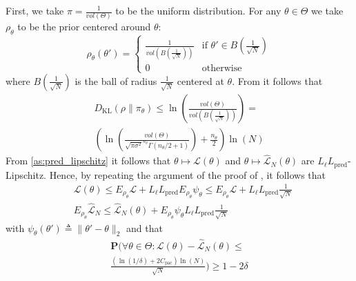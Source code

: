 \documentclass{ifacconf}
\newcommand{\KL}{D_{\mathrm{KL}}}
\newcommand{\bP}{\mathbf{P}}
\begin{document}
\begin{pf}
  First, we take $\pi=\frac{1}{vol(\Theta)}$ to be the uniform distribution.
  For any $\theta \in \Theta$ we take $\rho_\theta$ to be the prior centered around $\theta$: 
  $$\rho_{\theta}(\theta')=\left\{\begin{array}{rl}
       \frac{1}{vol(B(\frac{1}{\sqrt{N}}))} & \text{if } \theta' \in B(\frac{1}{\sqrt{N}}) \\
       0 & \text{otherwise}
     \end{array}\right.$$    
     where $B(\frac{1}{\sqrt{N}})$ is the ball of radius $\frac{1}{\sqrt{N}}$ centered at $\theta$.
From \cite[Lemma C.24]{Nips2026} it follows that 
\begin{multline}
\KL(\rho \|\pi_\theta) \le 
  \ln\left(\frac{vol(\Theta)}{vol(B(\frac{1}{\sqrt{N}}))}\right)= \\
  \left(\ln\left(\frac{vol(\Theta)}{\sqrt{\pi \sigma^2}^{n_{\theta}} \Gamma(n_{\theta}/2+1)}\right)+ \frac{n_{\theta}}{2} \right) \ln(N)
\end{multline}
From \ref{as:pred_lipschitz} it follows that
$\theta \mapsto \mathcal{L}(\theta)$ and 
$\theta \mapsto \hat{\mathcal{L}}_N(\theta)$ are $L_{\ell}L_{\text{pred}}$-Lipschitz. Hence, by repeating the argument of the proof
of \cite[Corollary  C23]{Nips2026}, it follows that
\begin{equation}
  \label{loss:lipschitz1}
\begin{split}
   & \mathcal{L}(\theta) \le E_{\rho_\theta} \mathcal{L} +
     L_{\ell}L_{\text{pred}} E_{\rho_\theta}\psi_\theta \le  
      E_{\rho_\theta} \mathcal{L} + L_{\ell}L_{\text{pred}}\frac{1}{\sqrt{N}} \\
    & E_{\rho_\theta} \hat{\mathcal{L}}_N \le \hat{\mathcal{L}}_N(\theta) +
     E_{\rho_\theta}\psi_\theta
    L_{\ell}L_{\text{pred}}\frac{1}{\sqrt{N}}
\end{split}
\end{equation}
with $\psi_\theta(\theta') \triangleq\|\theta' - \theta\|_2 $ and that
\begin{multline}
  \label{eq:pac_un1}
  \bP(\forall \theta \in \Theta: \mathcal{L}(\theta) - \hat{\mathcal{L}}_N(\theta) \le
  \\ \frac{(\ln(1/\delta)+ 2C_{\text{pac}}) \ln(N)}{\sqrt{N}}) \ge 1-2\delta
\end{multline}


\end{pf}
\end{document}
